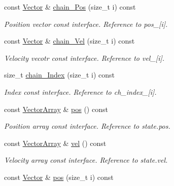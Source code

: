 \begin{DoxyCompactItemize}
const \mbox{\hyperlink{class_space_h_1_1_vel_indep_particles_a61bbcfdb0dc7f99f3c68af69a755c935}{Vector}} \& \mbox{\hyperlink{class_space_h_1_1_vel_indep_chain_particles_a1d1f6b6ed5e916f84e6502d98773ed13}{chain_\+Pos}} (size\+\_\+t i) const
\begin{DoxyCompactList}\small\item\em Position vector const interface. Reference to pos\+\_\+\mbox{[}i\mbox{]}. \end{DoxyCompactList}\item 
const \mbox{\hyperlink{class_space_h_1_1_vel_indep_particles_a61bbcfdb0dc7f99f3c68af69a755c935}{Vector}} \& \mbox{\hyperlink{class_space_h_1_1_vel_indep_chain_particles_a05d9529a4ee452b4c15efe92584a6d25}{chain_\+Vel}} (size\+\_\+t i) const
\begin{DoxyCompactList}\small\item\em Velocity vecotr const interface. Reference to vel\+\_\+\mbox{[}i\mbox{]}. \end{DoxyCompactList}\item 
size\+\_\+t \mbox{\hyperlink{class_space_h_1_1_vel_indep_chain_particles_ae66137f6ce2394142db438fd010ae17c}{chain_\+Index}} (size\+\_\+t i) const
\begin{DoxyCompactList}\small\item\em Index const interface. Reference to ch\+\_\+index\+\_\+\mbox{[}i\mbox{]}. \end{DoxyCompactList}\item 
const \mbox{\hyperlink{class_space_h_1_1_vel_indep_particles_aa9983058940249df8b00fa800e8cbad2}{Vector\+Array}} \& \mbox{\hyperlink{class_space_h_1_1_vel_indep_chain_particles_adaa5317f0c4a09c847d830de1691d156}{pos}} () const
\begin{DoxyCompactList}\small\item\em Position array const interface. Reference to state.\+pos. \end{DoxyCompactList}\item 
const \mbox{\hyperlink{class_space_h_1_1_vel_indep_particles_aa9983058940249df8b00fa800e8cbad2}{Vector\+Array}} \& \mbox{\hyperlink{class_space_h_1_1_vel_indep_chain_particles_aadbc08f6cf8da3e46eb8d6c619e30c2f}{vel}} () const
\begin{DoxyCompactList}\small\item\em Velocity array const interface. Reference to state.\+vel. \end{DoxyCompactList}\item 
const \mbox{\hyperlink{class_space_h_1_1_vel_indep_particles_a61bbcfdb0dc7f99f3c68af69a755c935}{Vector}} \& \mbox{\hyperlink{class_space_h_1_1_vel_indep_chain_particles_a5cae7fea0fe56f87e1e1ca7da09fdeae}{pos}} (size\+\_\+t i) const

\end{DoxyCompactItemize}

